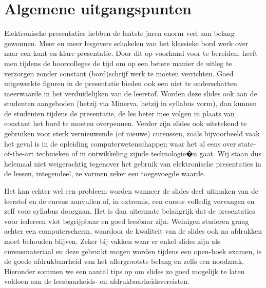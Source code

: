 \documentclass[a4paper,11pt,oneside]{article}
\newcommand{\npar}{\vspace{0.5cm} \par \noindent}      %
\begin{document}
\section{\sffamily Algemene uitgangspunten}
\npar Elektronische presentaties hebben de laatste jaren enorm veel aan belang gewonnen.  Meer en meer lesgevers schakelen van het klassieke bord werk over naar een kant-en-klare presentatie.  Door dit op voorhand voor te bereiden, heeft men tijdens de hoorcolleges de tijd om op een betere manier de uitleg te verzorgen zonder constant (bord)schrijf werk te moeten verrichten.  Goed uitgewerkte figuren in de presentatie bieden ook een niet te onderschatten meerwaarde in het verduidelijken van de leerstof. Worden deze slides ook aan de studenten aangeboden (hetzij via Minerva, hetzij in syllabus vorm), dan kunnen de studenten tijdens de presentatie, de les beter mee volgen in plaats van constant het bord te moeten overpennen.  Verder zijn slides ook uitstekend te gebruiken voor sterk vernieuwende (of nieuwe) cursussen, zoals bijvoorbeeld vaak het geval is in de opleiding computerwetenschappen waar het al eens over state-of-the-art technieken of in ontwikkeling zijnde technologie�n gaat.  Wij staan dus helemaal niet weigerachtig tegenover het gebruik van elektronische presentaties in de lessen, integendeel, ze vormen zeker een toegevoegde waarde.
\npar Het kan echter wel een probleem worden wanneer de slides deel uitmaken van de leerstof en de cursus aanvullen of, in extremis, een cursus volledig vervangen en zelf voor syllabus doorgaan.  Het is dan uitermate belangrijk dat de presentaties voor iedereen vlot begrijpbaar en goed leesbaar zijn.  Weinigen studeren graag achter een computerscherm, waardoor de kwaliteit van de slides ook na afdrukken moet behouden blijven.  Zeker bij vakken waar er enkel slides zijn als cursusmateriaal en deze gebruikt mogen worden tijdens een open-boek examen, is de goede afdrukbaarheid van het allergrootste belang en zelfs een noodzaak.  Hieronder sommen we een aantal tips op om slides zo goed mogelijk te laten voldoen aan de leesbaarheids- en afdrukbaarheidsvereisten.
\end{document}
